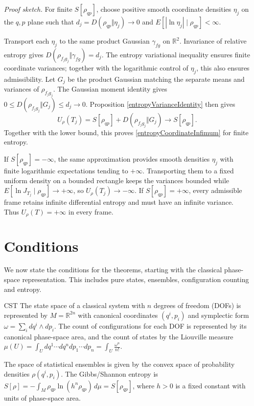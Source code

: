 \documentclass{techbrief}
\begin{document}
\noindent\emph{Proof sketch.}
For finite $S[\rho_{qp}]$, choose positive smooth coordinate densities $\eta_j$ on the $q,p$ plane such that $d_j=D(\rho_{qp}\Vert\eta_j)\to0$ and $E[|\ln\eta_j|\mid\rho_{qp}]<\infty$.

Transport each $\eta_j$ to the same product Gaussian $\gamma_{fg}$ on $\mathbb{R}^2$. Invariance of relative entropy gives $D(\rho_{f_jg_j}\Vert\gamma_{fg})=d_j$. The entropy variational inequality ensures finite coordinate variances; together with the logarithmic control of $\eta_j$, this also ensures admissibility. Let $G_j$ be the product Gaussian matching the separate means and variances of $\rho_{f_jg_j}$. The Gaussian moment identity gives $0\leq D(\rho_{f_jg_j}\Vert G_j)\leq d_j\to0$. Proposition \ref{entropyVarianceIdentity} then gives
\begin{equation*}
	U_\rho(T_j)=S[\rho_{qp}]+D(\rho_{f_jg_j}\Vert G_j)\longrightarrow S[\rho_{qp}].
\end{equation*}
Together with the lower bound, this proves \eqref{entropyCoordinateInfimum} for finite entropy.

If $S[\rho_{qp}]=-\infty$, the same approximation provides smooth densities $\eta_j$ with finite logarithmic expectations tending to $+\infty$. Transporting them to a fixed uniform density on a bounded rectangle keeps the variances bounded while $E[\ln J_{T_j}\mid\rho_{qp}]\to+\infty$, so $U_\rho(T_j)\to-\infty$. If $S[\rho_{qp}]=+\infty$, every admissible frame retains infinite differential entropy and must have an infinite variance. Thus $U_\rho(T)=+\infty$ in every frame.

\section{Conditions}

We now state the conditions for the theorems, starting with the classical phase-space representation. This includes pure states, ensembles, configuration counting and entropy.

\begin{condition}{CST}
	The state space of a classical system with $n$ degrees of freedom (DOFs) is represented by $M=\mathbb{R}^{2n}$ with canonical coordinates $(q^i,p_i)$ and symplectic form $\omega=\sum_i dq^i\wedge dp_i$. The count of configurations for each DOF is represented by its canonical phase-space area, and the count of states by the Liouville measure $\mu(U)=\int_U dq^1\cdots dq^n dp_1\cdots dp_n=\int_U\frac{\omega^n}{n!}$.

	The space of statistical ensembles is given by the convex space of probability densities $\rho(q^i,p_i)$. The Gibbs/Shannon entropy is $S[\rho]=-\int_M\rho_{qp}\ln(h^n\rho_{qp})\,d\mu=S[\rho_{qp}]$, where $h>0$ is a fixed constant with units of phase-space area.
\end{condition}
\end{document}
